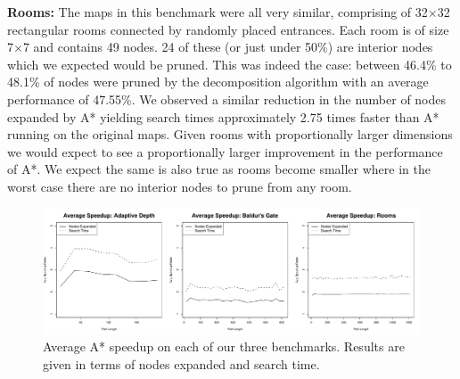 \par
\textbf{Rooms:}
The maps in this benchmark were all very similar, comprising of 32$\times$32
rectangular rooms connected by randomly placed entrances.
Each room is of size 7$\times$7 and contains 49 nodes. 
24 of these (or just under 50\%) are interior nodes which we expected would be
pruned.
This was indeed the case: between 46.4\% to 48.1\% of nodes were pruned by 
the decomposition algorithm with an average performance of 47.55\%.
We observed a similar reduction in the number of nodes expanded by A* yielding
search times approximately 2.75 times faster than A* running on the original
maps.
Given rooms with proportionally larger dimensions we would expect to see a
proportionally larger improvement in the performance of A*.
We expect the same is also true as rooms become smaller where in the worst case
there are no interior nodes to prune from any room.

\begin{figure}[t]
       \begin{center}
                       \includegraphics[width=1.95\columnwidth, trim = 10mm 10mm 10mm 0mm]{diagrams/speedup.pdf}
       \end{center}
       \caption{Average A* speedup on each of our three benchmarks. 
		Results are given in terms of nodes expanded and search time.}
\label{fig-speedup}
\end{figure}
